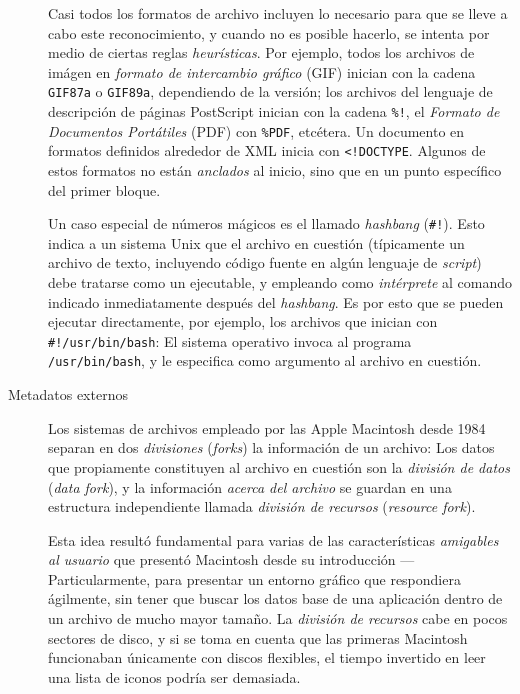 \documentclass[11pt,fleqn]{book} %
\begin{document}
\begin{description}
     Casi todos los formatos de archivo incluyen lo necesario para que
     se lleve a cabo este reconocimiento, y cuando no es posible
     hacerlo, se intenta por medio de ciertas reglas \emph{heurísticas}.
     Por ejemplo, todos los archivos de imágen en \emph{formato de      intercambio gráfico} (GIF) inician con la cadena \texttt{GIF87a} o
     \texttt{GIF89a}, dependiendo de la versión; los archivos del lenguaje de
     descripción de páginas PostScript inician con la cadena \texttt{\%!}, el
     \emph{Formato de Documentos Portátiles} (PDF) con \texttt{\%PDF}, etcétera. Un
     documento en formatos definidos alrededor de XML inicia con
     \texttt{<!DOCTYPE}.  Algunos de estos formatos no están \emph{anclados} al
     inicio, sino que en un punto específico del primer bloque.

     Un caso especial de números mágicos es el llamado \emph{hashbang}
     (\texttt{\#!}). Esto indica a un sistema Unix que el archivo en cuestión
     (típicamente un archivo de texto, incluyendo código fuente en
     algún lenguaje de \emph{script}) debe tratarse como un ejecutable, y
     empleando como \emph{intérprete} al comando indicado inmediatamente
     después del \emph{hashbang}. Es por esto que se pueden ejecutar
     directamente, por ejemplo, los archivos que inician con
     \texttt{\#!/usr/bin/bash}: El sistema operativo invoca al programa
     \texttt{/usr/bin/bash}, y le especifica como argumento al archivo en
     cuestión.
\item[Metadatos externos] Los sistemas de archivos empleado por las
     Apple Macintosh desde 1984 separan en dos \emph{divisiones} (\emph{forks})
     la información de un archivo: Los datos que propiamente
     constituyen al archivo en cuestión son la \emph{división de datos}
     (\emph{data fork}), y la información \emph{acerca del archivo} se guardan
     en una estructura independiente llamada \emph{división de recursos}
     (\emph{resource fork}).

     Esta idea resultó fundamental para varias de las características
     \emph{amigables al usuario} que presentó Macintosh desde su
     introducción — Particularmente, para presentar un entorno gráfico
     que respondiera ágilmente, sin tener que buscar los datos base de
     una aplicación dentro de un archivo de mucho mayor tamaño. La
     \emph{división de recursos} cabe en pocos sectores de disco, y si
     se toma en cuenta que las primeras Macintosh funcionaban
     únicamente con discos flexibles, el tiempo invertido en leer una
     lista de iconos podría ser demasiada.


\end{description}
\end{document}
